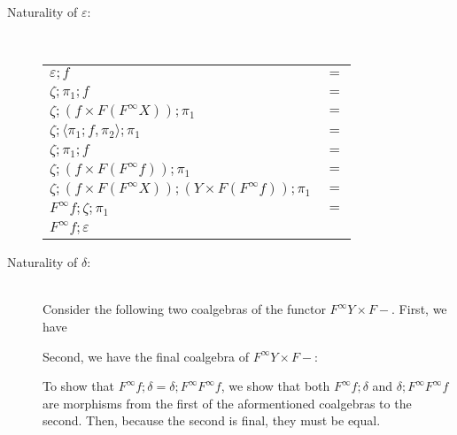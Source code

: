 \documentclass{article}
\begin{document}
\begin{description}
\item[Naturality of $\varepsilon$:]~\\
\begin{center}
\begin{tabular}{ll}
$\varepsilon;f$ & $=$\\
$\zeta;\pi_1;f$ & $=$\\
$\zeta;(f \times F(F^{\infty}X));\pi_1$ & $=$ \\
$\zeta;\langle \pi_1;f, \pi_2 \rangle;\pi_1$ & $=$ \\
$\zeta;\pi_1;f$ & $=$ \\
$\zeta;(f \times F(F^{\infty}f));\pi_1$ & $=$ \\
$\zeta;(f \times F(F^{\infty}X));(Y \times F(F^{\infty}f));\pi_1$ & $=$ \\
$F^{\infty}f;\zeta;\pi_1$ & $=$ \\
$F^{\infty}f;\varepsilon$ &
\end{tabular}
\end{center}

\item[Naturality of $\delta$:]~\\

Consider the following two coalgebras of the functor $F^{\infty}Y \times F-$. First, we have
\begin{center}
\end{center}

Second, we have the final coalgebra of $F^{\infty}Y \times F-$:

\begin{center}
\end{center}

To show that $F^{\infty}f;\delta = \delta;F^{\infty}F^{\infty}f$, we show that both $F^{\infty}f;\delta$ and 
$\delta;F^{\infty}F^{\infty}f$ are morphisms from the first of the aformentioned coalgebras to the second.
Then, because the second is final, they must be equal.


\end{description}
\end{document}
